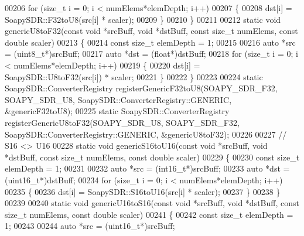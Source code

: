 \begin{DoxyCode}
00206   \textcolor{keywordflow}{for} (\textcolor{keywordtype}{size\_t} i = 0; i < numElems*elemDepth; i++)
00207     \{
00208       dst[i] = SoapySDR::F32toU8(src[i] * scaler);
00209     \}
00210 \}
00211 
00212 \textcolor{keyword}{static} \textcolor{keywordtype}{void} genericU8toF32(\textcolor{keyword}{const} \textcolor{keywordtype}{void} *srcBuff, \textcolor{keywordtype}{void} *dstBuff, \textcolor{keyword}{const} \textcolor{keywordtype}{size\_t} numElems, \textcolor{keyword}{const} \textcolor{keywordtype}{double} scaler)
00213 \{
00214   \textcolor{keyword}{const} \textcolor{keywordtype}{size\_t} elemDepth = 1;
00215 
00216   \textcolor{keyword}{auto} *src = (uint8\_t*)srcBuff;
00217   \textcolor{keyword}{auto} *dst = (\textcolor{keywordtype}{float}*)dstBuff;
00218   \textcolor{keywordflow}{for} (\textcolor{keywordtype}{size\_t} i = 0; i < numElems*elemDepth; i++)
00219     \{
00220       dst[i] = SoapySDR::U8toF32(src[i]) * scaler;
00221     \}
00222 \}
00223 
00224 \textcolor{keyword}{static} SoapySDR::ConverterRegistry registerGenericF32toU8(SOAPY_SDR_F32, 
      SOAPY_SDR_U8, SoapySDR::ConverterRegistry::GENERIC, &genericF32toU8);
00225 \textcolor{keyword}{static} SoapySDR::ConverterRegistry registerGenericU8toF32(SOAPY_SDR_U8, 
      SOAPY_SDR_F32, SoapySDR::ConverterRegistry::GENERIC, &genericU8toF32);
00226 
00227 \textcolor{comment}{// S16 <> U16}
00228 \textcolor{keyword}{static} \textcolor{keywordtype}{void} genericS16toU16(\textcolor{keyword}{const} \textcolor{keywordtype}{void} *srcBuff, \textcolor{keywordtype}{void} *dstBuff, \textcolor{keyword}{const} \textcolor{keywordtype}{size\_t} numElems, \textcolor{keyword}{const} \textcolor{keywordtype}{double} scaler)
00229 \{
00230   \textcolor{keyword}{const} \textcolor{keywordtype}{size\_t} elemDepth = 1;
00231 
00232   \textcolor{keyword}{auto} *src = (int16\_t*)srcBuff;
00233   \textcolor{keyword}{auto} *dst = (uint16\_t*)dstBuff;
00234   \textcolor{keywordflow}{for} (\textcolor{keywordtype}{size\_t} i = 0; i < numElems*elemDepth; i++)
00235     \{
00236       dst[i] = SoapySDR::S16toU16(src[i] * scaler);
00237     \}
00238 \}
00239 
00240 \textcolor{keyword}{static} \textcolor{keywordtype}{void} genericU16toS16(\textcolor{keyword}{const} \textcolor{keywordtype}{void} *srcBuff, \textcolor{keywordtype}{void} *dstBuff, \textcolor{keyword}{const} \textcolor{keywordtype}{size\_t} numElems, \textcolor{keyword}{const} \textcolor{keywordtype}{double} scaler)
00241 \{
00242   \textcolor{keyword}{const} \textcolor{keywordtype}{size\_t} elemDepth = 1;
00243 
00244   \textcolor{keyword}{auto} *src = (uint16\_t*)srcBuff;

\end{DoxyCode}
